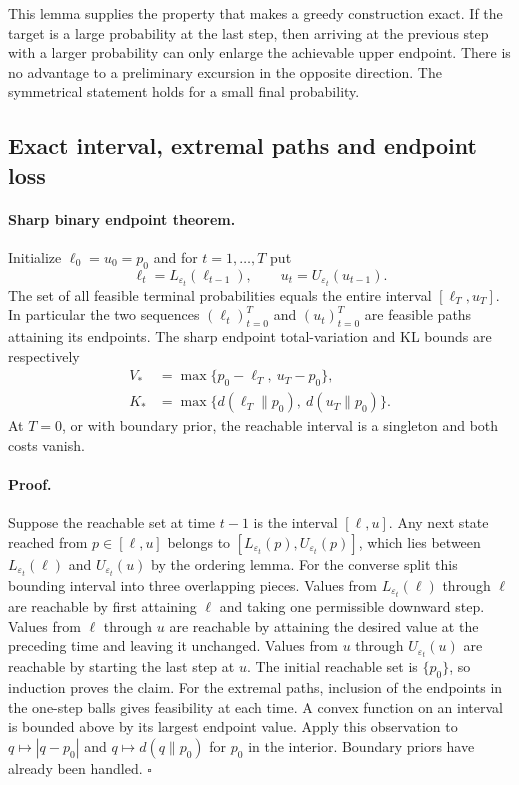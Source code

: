 \documentclass[12pt,letterpaper]{article}
\begin{document}
This lemma supplies the property that makes a greedy construction exact. If the target is a large probability at the last step, then arriving at the previous step with a larger probability can only enlarge the achievable upper endpoint. There is no advantage to a preliminary excursion in the opposite direction. The symmetrical statement holds for a small final probability.

\subsection{Exact interval, extremal paths and endpoint loss}

\paragraph{Sharp binary endpoint theorem.}
Initialize $\ell_0=u_0=p_0$ and for $t=1,\ldots,T$ put
\begin{equation}
 \ell_t=L_{\varepsilon_t}(\ell_{t-1}),
 \qquad
 u_t=U_{\varepsilon_t}(u_{t-1}).
 \label{eq:bd-rec}
\end{equation}
The set of all feasible terminal probabilities equals the entire interval $[\ell_T,u_T]$. In particular the two sequences $(\ell_t)_{t=0}^T$ and $(u_t)_{t=0}^T$ are feasible paths attaining its endpoints. The sharp endpoint total-variation and KL bounds are respectively
\begin{align}
 V_*&=\max\{p_0-\ell_T,\ u_T-p_0\},\label{eq:bd-tv}\\
 K_*&=\max\{d(\ell_T\|p_0),\ d(u_T\|p_0)\}.\label{eq:bd-kl}
\end{align}
At $T=0$, or with boundary prior, the reachable interval is a singleton and both costs vanish.

\paragraph{Proof.}
Suppose the reachable set at time $t-1$ is the interval $[\ell,u]$. Any next state reached from $p\in[\ell,u]$ belongs to $[L_{\varepsilon_t}(p),U_{\varepsilon_t}(p)]$, which lies between $L_{\varepsilon_t}(\ell)$ and $U_{\varepsilon_t}(u)$ by the ordering lemma. For the converse split this bounding interval into three overlapping pieces. Values from $L_{\varepsilon_t}(\ell)$ through $\ell$ are reachable by first attaining $\ell$ and taking one permissible downward step. Values from $\ell$ through $u$ are reachable by attaining the desired value at the preceding time and leaving it unchanged. Values from $u$ through $U_{\varepsilon_t}(u)$ are reachable by starting the last step at $u$. The initial reachable set is $\{p_0\}$, so induction proves the claim. For the extremal paths, inclusion of the endpoints in the one-step balls gives feasibility at each time. A convex function on an interval is bounded above by its largest endpoint value. Apply this observation to $q\mapsto|q-p_0|$ and $q\mapsto d(q\|p_0)$ for $p_0$ in the interior. Boundary priors have already been handled. \hfill$\square$
\end{document}

